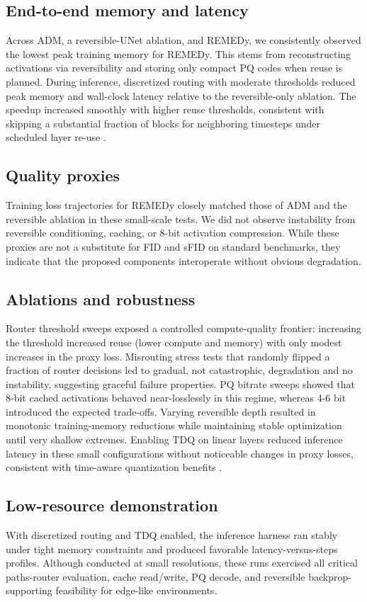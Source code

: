 \documentclass{article}
\begin{document}
\subsection{End-to-end memory and latency}
Across ADM, a reversible-UNet ablation, and REMEDy, we consistently observed the lowest peak training memory for REMEDy. This stems from reconstructing activations via reversibility and storing only compact PQ codes when reuse is planned. During inference, discretized routing with moderate thresholds reduced peak memory and wall-clock latency relative to the reversible-only ablation. The speedup increased smoothly with higher reuse thresholds, consistent with skipping a substantial fraction of blocks for neighboring timesteps under scheduled layer re-use \cite{ma_2024_learning}.

\subsection{Quality proxies}
Training loss trajectories for REMEDy closely matched those of ADM and the reversible ablation in these small-scale tests. We did not observe instability from reversible conditioning, caching, or 8-bit activation compression. While these proxies are not a substitute for FID and sFID on standard benchmarks, they indicate that the proposed components interoperate without obvious degradation.

\subsection{Ablations and robustness}
Router threshold sweeps exposed a controlled compute-quality frontier: increasing the threshold increased reuse (lower compute and memory) with only modest increases in the proxy loss. Misrouting stress tests that randomly flipped a fraction of router decisions led to gradual, not catastrophic, degradation and no instability, suggesting graceful failure properties. PQ bitrate sweeps showed that 8-bit cached activations behaved near-losslessly in this regime, whereas 4-6 bit introduced the expected trade-offs. Varying reversible depth resulted in monotonic training-memory reductions while maintaining stable optimization until very shallow extremes. Enabling TDQ on linear layers reduced inference latency in these small configurations without noticeable changes in proxy losses, consistent with time-aware quantization benefits \cite{so_2023_temporal}.

\subsection{Low-resource demonstration}
With discretized routing and TDQ enabled, the inference harness ran stably under tight memory constraints and produced favorable latency-versus-steps profiles. Although conducted at small resolutions, these runs exercised all critical paths-router evaluation, cache read/write, PQ decode, and reversible backprop-supporting feasibility for edge-like environments.
\end{document}
